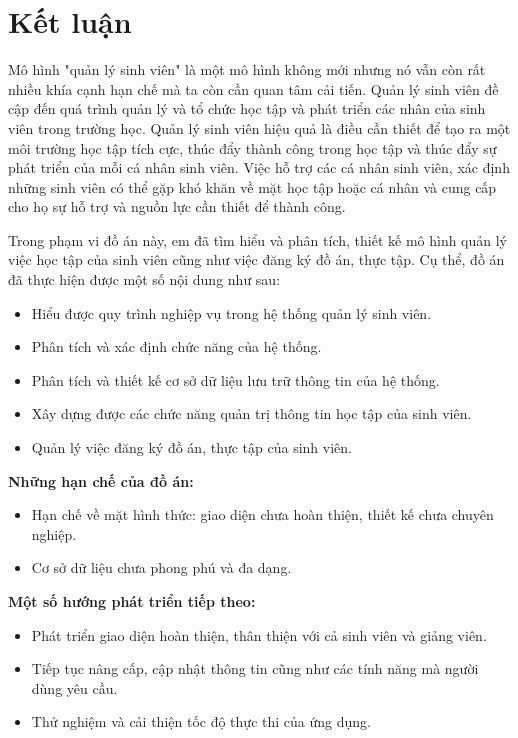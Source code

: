 \chapter*{Kết luận}
Mô hình "quản lý sinh viên" là một mô hình không mới nhưng nó vẫn còn rất nhiều khía cạnh hạn chế mà ta còn cần quan tâm cải tiến.
Quản lý sinh viên đề cập đến quá trình quản lý và tổ chức học tập và phát triển các nhân của sinh viên trong trường học.
Quản lý sinh viên hiệu quả là điều cần thiết để tạo ra một môi trường học tập tích cực, thúc đẩy thành công trong học tập và thúc đẩy sự phát triển của mỗi cá nhân sinh viên.
Việc hỗ trợ các cá nhân sinh viên, xác định những sinh viên có thể gặp khó khăn về mặt học tập hoặc cá nhân và cung cấp cho họ sự hỗ trợ và nguồn lực cần thiết để thành công.

Trong phạm vi đồ án này, em đã tìm hiểu và phân tích, thiết kế mô hình quản lý việc học tập của sinh viên cũng như việc đăng ký đồ án, thực tập. Cụ thể, đồ án đã thực hiện được một số nội dung như sau:
  \begin{itemize}
    \item Hiểu được quy trình nghiệp vụ trong hệ thống quản lý sinh viên.
    \item Phân tích và xác định chức năng của hệ thống.
    \item Phân tích và thiết kế cơ sở dữ liệu lưu trữ thông tin của hệ thống.
    \item Xây dựng được các chức năng quản trị thông tin học tập của sinh viên.
    \item Quản lý việc đăng ký đồ án, thực tập của sinh viên.
  \end{itemize}


\noindent\textbf{Những hạn chế của đồ án:}
\begin{itemize}
  \item Hạn chế về mặt hình thức: giao diện chưa hoàn thiện, thiết kế chưa chuyên nghiệp.
  \item Cơ sở dữ liệu chưa phong phú và đa dạng.
\end{itemize}

\noindent\textbf{Một số hướng phát triển tiếp theo:}
  \begin{itemize}
    \item Phát triển giao diện hoàn thiện, thân thiện với cả sinh viên và giảng viên.
    \item Tiếp tục nâng cấp, cập nhật thông tin cũng như các tính năng mà người dùng yêu cầu.
    \item Thử nghiệm và cải thiện tốc độ thực thi của ứng dụng.
  \end{itemize}